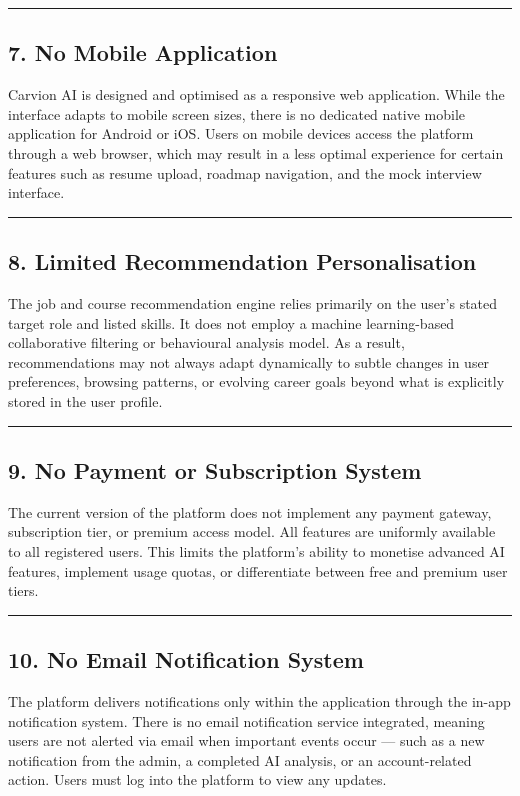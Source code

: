 \documentclass[12pt]{article}
\begin{document}
\noindent\rule{\textwidth}{0.4pt}

\subsection{7. No Mobile Application}

Carvion AI is designed and optimised as a responsive web application. While the interface adapts to mobile screen sizes, there is no dedicated native mobile application for Android or iOS. Users on mobile devices access the platform through a web browser, which may result in a less optimal experience for certain features such as resume upload, roadmap navigation, and the mock interview interface.

\noindent\rule{\textwidth}{0.4pt}

\subsection{8. Limited Recommendation Personalisation}

The job and course recommendation engine relies primarily on the user's stated target role and listed skills. It does not employ a machine learning-based collaborative filtering or behavioural analysis model. As a result, recommendations may not always adapt dynamically to subtle changes in user preferences, browsing patterns, or evolving career goals beyond what is explicitly stored in the user profile.

\noindent\rule{\textwidth}{0.4pt}

\subsection{9. No Payment or Subscription System}

The current version of the platform does not implement any payment gateway, subscription tier, or premium access model. All features are uniformly available to all registered users. This limits the platform's ability to monetise advanced AI features, implement usage quotas, or differentiate between free and premium user tiers.

\noindent\rule{\textwidth}{0.4pt}

\subsection{10. No Email Notification System}

The platform delivers notifications only within the application through the in-app notification system. There is no email notification service integrated, meaning users are not alerted via email when important events occur — such as a new notification from the admin, a completed AI analysis, or an account-related action. Users must log into the platform to view any updates.
\end{document}
